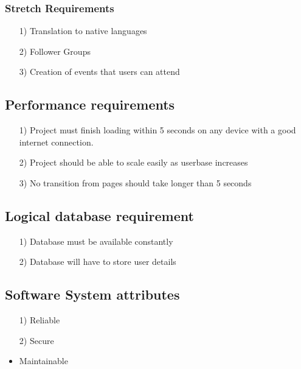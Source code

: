 \documentclass[10pt,a4paper]{article}
\begin{document}
\subsubsection{Stretch Requirements}

\begin{itemize}

\item[1)]
Translation to native languages

\item[2)]
Follower Groups

\item[3)]
Creation of events that users can attend

\end{itemize}

\subsection{Performance requirements}

\begin{itemize}

\item[1)]
Project must finish loading within 5 seconds on any device with a good internet connection.

\item[2)]
Project should be able to scale easily as userbase increases

\item[3)]
No transition from pages should take longer than 5 seconds

\end{itemize}

\subsection{Logical database requirement}

\begin{itemize}

\item[1)]
Database must be available constantly

\item[2)]
Database will have to store user details

\end{itemize}



\subsection{Software System attributes}

\begin{itemize}
\item[1)]
Reliable
\item[2)]
Secure
\item
Maintainable
\end{itemize}
\end{document}
